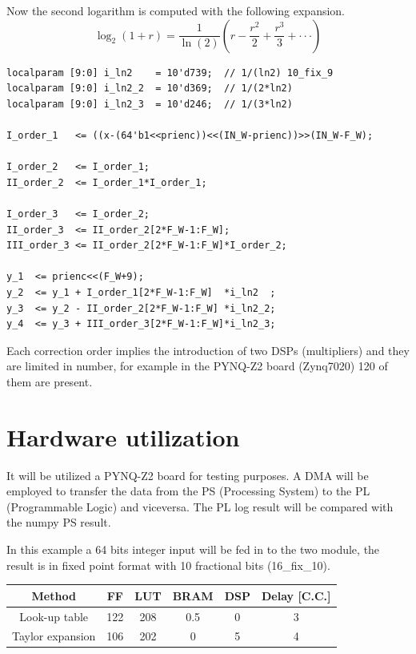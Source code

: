 \documentclass[12pt]{article}
\begin{document}
Now the second logarithm is computed with the following expansion.
\begin{equation}
    \log_2\left(1+r\right)=\frac{1}{\ln(2)}\left(r-\frac{r^2}{2}+\frac{r^3}{3}+ \cdot \cdot \cdot \right) 
\end{equation}

\begin{lstlisting}[style={verilog-style}]
localparam [9:0] i_ln2    = 10'd739;  // 1/(ln2) 10_fix_9
localparam [9:0] i_ln2_2  = 10'd369;  // 1/(2*ln2)
localparam [9:0] i_ln2_3  = 10'd246;  // 1/(3*ln2)

I_order_1   <= ((x-(64'b1<<prienc))<<(IN_W-prienc))>>(IN_W-F_W);
                    
I_order_2   <= I_order_1;
II_order_2  <= I_order_1*I_order_1;
                    
I_order_3   <= I_order_2;
II_order_3  <= II_order_2[2*F_W-1:F_W];
III_order_3 <= II_order_2[2*F_W-1:F_W]*I_order_2;

y_1  <= prienc<<(F_W+9);
y_2  <= y_1 + I_order_1[2*F_W-1:F_W]  *i_ln2  ;
y_3  <= y_2 - II_order_2[2*F_W-1:F_W] *i_ln2_2;
y_4  <= y_3 + III_order_3[2*F_W-1:F_W]*i_ln2_3;

\end{lstlisting}


Each correction order implies the introduction of two DSPs (multipliers) and they are limited in number, for example in the PYNQ-Z2 board (Zynq7020) 120 of them are present. 
\section{Hardware utilization}
It will be utilized a PYNQ-Z2 board for testing purposes. A DMA will be employed to transfer the data from the PS (Processing System) to the PL (Programmable Logic) and viceversa. The PL log result will be compared with the numpy PS result.  

In this example a 64 bits integer input will be fed in to the two module, the result is in fixed point format with 10 fractional bits (16\_fix\_10).


\begin{table}[h]
\begin{tabular}{c|ccccc}
Method           & FF  & LUT & BRAM & DSP & Delay [C.C.] \\ \hline
Look-up table    & 122 & 208 & 0.5  & 0   & 3 \\
Taylor expansion & 106 & 202 & 0    & 5   & 4 \\

\end{tabular}
\end{table}
\end{document}
